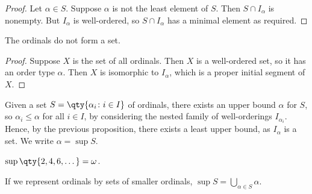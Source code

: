 \begin{proof}
    Let $\alpha \in S$.
    Suppose $\alpha$ is not the least element of $S$.
    Then $S \cap I_\alpha$ is nonempty.
    But $I_\alpha$ is well-ordered, so $S \cap I_\alpha$ has a minimal element as required.
\end{proof}
\begin{theorem}
    The ordinals do not form a set.
\end{theorem}
\begin{proof}
    Suppose $X$ is the set of all ordinals.
    Then $X$ is a well-ordered set, so it has an order type $\alpha$.
    Then $X$ is isomorphic to $I_\alpha$, which is a proper initial segment of $X$.
\end{proof}
\begin{remark}
    Given a set $S = \qty{\alpha_i \colon i \in I}$ of ordinals, there exists an upper bound $\alpha$ for $S$, so $\alpha_i \leq \alpha$ for all $i \in I$, by considering the nested family of well-orderings $I_{\alpha_i}$.
    Hence, by the previous proposition, there exists a least upper bound, as $I_\alpha$ is a set.
    We write $\alpha = \sup S$.
\end{remark}
\begin{example}
    $\sup \qty{2, 4, 6, \dots} = \omega$.
\end{example}
\begin{remark}
    If we represent ordinals by sets of smaller ordinals, $\sup S = \bigcup_{\alpha \in S} \alpha$.
\end{remark}

